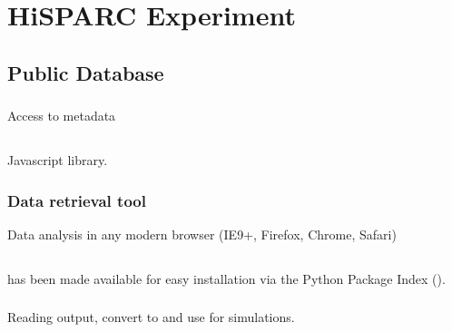 \chapter{HiSPARC Experiment}
\label{ch:hisparc-experiment}

\section{\hisparc Public Database}

\subsection{\api}

Access to metadata

\section{\jsparc}

Javascript library.

\subsection{Data retrieval tool}

Data analysis in any modern browser (IE9+, Firefox, Chrome, Safari)

\section{\sapphire}


\subsection{\pypi}

\sapphire has been made available for easy installation via the Python
Package Index (\pypi).


\subsection{\corsika}

Reading \corsika output, convert to \hdf and use for simulations.
